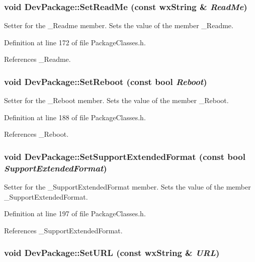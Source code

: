 \subsubsection{\setlength{\rightskip}{0pt plus 5cm}void Dev\-Package::Set\-Read\-Me (const wx\-String \& {\em Read\-Me})\hspace{0.3cm}{\tt  [inline]}}\label{class_dev_package_f4c6ea10677bceb7abba16210c798ff0}


Setter for the \_\-Readme member. Sets the value of the member \_\-Readme. 

Definition at line 172 of file Package\-Classes.h.

References \_\-Readme.
\subsubsection{\setlength{\rightskip}{0pt plus 5cm}void Dev\-Package::Set\-Reboot (const bool {\em Reboot})\hspace{0.3cm}{\tt  [inline]}}\label{class_dev_package_75b7e898fa8776f193b463619da5bf51}


Setter for the \_\-Reboot member. Sets the value of the member \_\-Reboot. 

Definition at line 188 of file Package\-Classes.h.

References \_\-Reboot.
\subsubsection{\setlength{\rightskip}{0pt plus 5cm}void Dev\-Package::Set\-Support\-Extended\-Format (const bool {\em Support\-Extended\-Format})\hspace{0.3cm}{\tt  [inline]}}\label{class_dev_package_a3b6ed7b622288bfafef36cc032531c1}


Setter for the \_\-Support\-Extended\-Format member. Sets the value of the member \_\-Support\-Extended\-Format. 

Definition at line 197 of file Package\-Classes.h.

References \_\-Support\-Extended\-Format.
\subsubsection{\setlength{\rightskip}{0pt plus 5cm}void Dev\-Package::Set\-URL (const wx\-String \& {\em URL})\hspace{0.3cm}{\tt  [inline]}}\label{class_dev_package_8ca37ebb1ba94623417258018932dcac}


